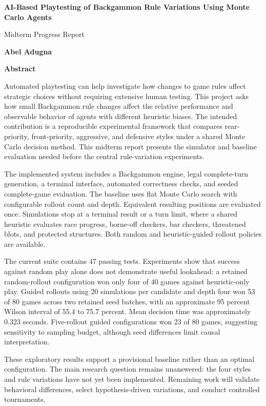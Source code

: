 \thispagestyle{plain}
{}
\begin{center}
    \Large
    \textbf{AI-Based Playtesting of Backgammon Rule Variations Using Monte Carlo Agents}

    \vspace{0.4cm}
    \large
    Midterm Progress Report

    \vspace{0.4cm}
    \textbf{Abel Adugna}

    \vspace{0.9cm}
    \textbf{Abstract}
\end{center}

Automated playtesting can help investigate how changes to game rules affect strategic choices without requiring extensive human testing. This project asks how small Backgammon rule changes affect the relative performance and observable behavior of agents with different heuristic biases. The intended contribution is a reproducible experimental framework that compares rear-priority, front-priority, aggressive, and defensive styles under a shared Monte Carlo decision method. This midterm report presents the simulator and baseline evaluation needed before the central rule-variation experiments.

The implemented system includes a Backgammon engine, legal complete-turn generation, a terminal interface, automated correctness checks, and seeded complete-game evaluation. The baseline uses flat Monte Carlo search with configurable rollout count and depth. Equivalent resulting positions are evaluated once. Simulations stop at a terminal result or a turn limit, where a shared heuristic evaluates race progress, borne-off checkers, bar checkers, threatened blots, and protected structures. Both random and heuristic-guided rollout policies are available.

The current suite contains 47 passing tests. Experiments show that success against random play alone does not demonstrate useful lookahead: a retained random-rollout configuration won only four of 40 games against heuristic-only play. Guided rollouts using 20 simulations per candidate and depth four won 53 of 80 games across two retained seed batches, with an approximate 95 percent Wilson interval of 55.4 to 75.7 percent. Mean decision time was approximately 0.323 seconds. Five-rollout guided configurations won 23 of 80 games, suggesting sensitivity to sampling budget, although seed differences limit causal interpretation.

These exploratory results support a provisional baseline rather than an optimal configuration. The main research question remains unanswered: the four styles and rule variations have not yet been implemented. Remaining work will validate behavioral differences, select hypothesis-driven variations, and conduct controlled tournaments.
